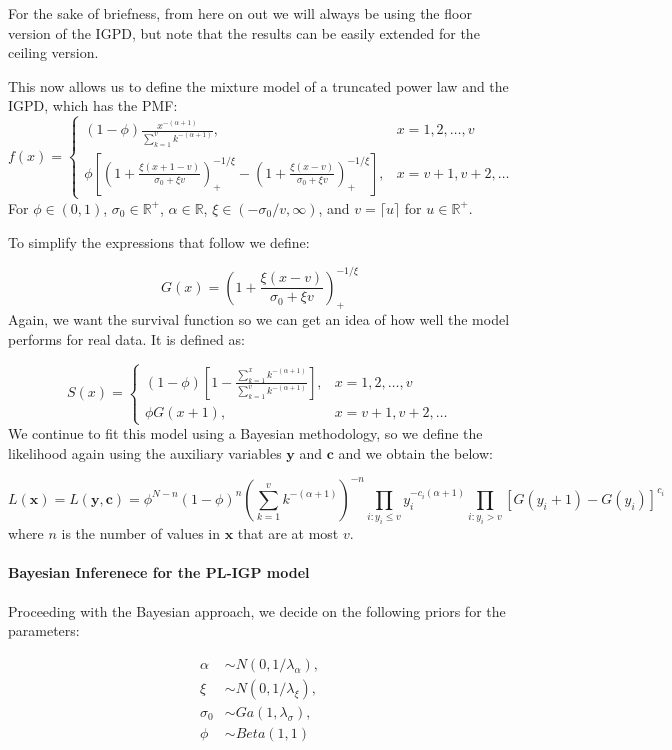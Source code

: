 \documentclass[
]{article}
\let\oldparagraph\paragraph
\renewcommand{\paragraph}[1]{\oldparagraph{#1}\mbox{}}
\begin{document}
For the sake of briefness, from here on out we will always be using the
floor version of the IGPD, but note that the results can be easily
extended for the ceiling version.

This now allows us to define the mixture model of a truncated power law
and the IGPD, which has the PMF: \[
f(x) = 
\begin{cases}
(1-\phi)\frac{x^{-(\alpha+1)}}{\sum_{k=1}^v k^{-(\alpha+1)}},&x=1,2,\ldots,v\\
\phi\left[\left(1+\frac{\xi(x+1-v)}{\sigma_0 + \xi v}\right)_+^{-1/\xi} - \left(1+\frac{\xi(x-v)}{\sigma_0 + \xi v}\right)_+^{-1/\xi}\right], &x=v+1, v+2, \ldots
\end{cases}
\] For \(\phi\in(0,1)\), \(\sigma_0 \in \mathbb{R}^+\),
\(\alpha\in\mathbb{R}\), \(\xi \in (-\sigma_0/v, \infty)\), and
\(v=\lceil u \rceil\) for \(u \in \mathbb{R}^+\).

To simplify the expressions that follow we define:

\[
G(x) = \left(1+\frac{\xi(x-v)}{\sigma_0 + \xi v}\right)_+^{-1/\xi}
\] Again, we want the survival function so we can get an idea of how
well the model performs for real data. It is defined as:

\[
S(x) = \begin{cases}
(1-\phi)\left[1-\frac{\sum_{k=1}^xk^{-(\alpha+1)}}{\sum_{k=1}^v k^{-(\alpha+1)}}\right], &x=1,2,\ldots,v\\
\phi G(x+1),&x=v+1,v+2, \ldots
\end{cases}
\] We continue to fit this model using a Bayesian methodology, so we
define the likelihood again using the auxiliary variables
\(\boldsymbol{y}\) and \(\boldsymbol{c}\) and we obtain the below:

\[
L(\boldsymbol{x}) = L(\boldsymbol{y}, \boldsymbol{c}) = \phi^{N-n}(1-\phi)^n \left(\sum_{k=1}^v k^{-(\alpha+1)}\right)^{-n}\prod_{i:y_i\le v}y_i^{-c_i(\alpha+1)}\prod_{i:y_i>v}\left[G(y_i+1) - G(y_i)\right]^{c_i}
\] where \(n\) is the number of values in \(\boldsymbol{x}\) that are at
most \(v\).

\paragraph{Bayesian Inferenece for the PL-IGP
model}\label{bayesian-inferenece-for-the-pl-igp-model}

Proceeding with the Bayesian approach, we decide on the following priors
for the parameters:

\begin{align*}
\alpha &\sim N(0,1/\lambda_\alpha),\\
\xi &\sim N(0,1/\lambda_\xi),\\
\sigma_0 &\sim Ga(1,\lambda_\sigma),\\
\phi &\sim Beta(1,1)\\
%
\end{align*}
\end{document}
